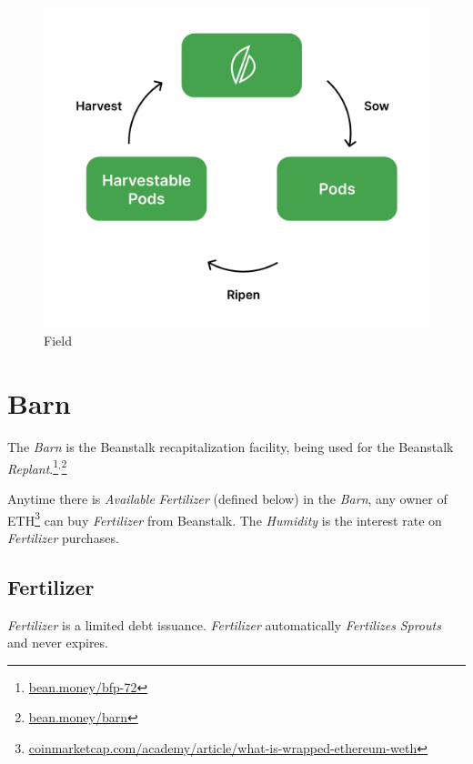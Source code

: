 \documentclass[tikz]{article}
\newcommand{\term}[1]{\textsl{#1}}
\newcommand{\fref}[1]{\footnote{\href{http://#1}{#1}}}
\begin{document}
\begin{figure}[h!]
    \centering
    \includegraphics[scale=.14]{Figure2}
    \vspace*{-5mm}
    \caption{Field}
    \label{fig 2}
\end{figure}


\section{Barn}

The \term{Barn} is the Beanstalk recapitalization facility, being used for the Beanstalk \term{Replant}.\footnote{\href{https://bean.money/bfp-72}{bean.money/bfp-72}}$^{,}$\footnote{\href{https://bean.money/barn}{bean.money/barn}}

Anytime there is \term{Available} \term{Fertilizer} (defined below) in the \term{Barn}, any owner of ETH\fref{coinmarketcap.com/academy/article/what-is-wrapped-ethereum-weth} can buy \term{Fertilizer} from Beanstalk. The \term{Humidity} is the interest rate on \term{Fertilizer} purchases.


\subsection{Fertilizer}

\term{Fertilizer} is a limited debt issuance. \term{Fertilizer} automatically \term{Fertilizes} \term{Sprouts} and never expires.
\end{document}

